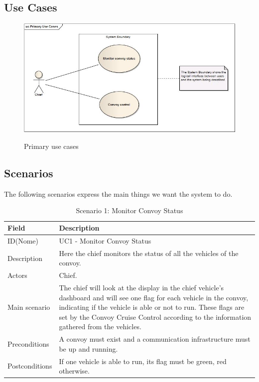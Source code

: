 \documentclass{llncs}
\newcommand{\labelfig}[1]{\label{fig:#1}}
\begin{document}
\newpage

\subsection{Use Cases}

\begin{figure}
   \centering
   \includegraphics[scale = 0.5]{../Diagrams/Primary_Use_Cases.jpg}\\
  \caption{Primary use cases}\labelfig{testTypes}
\end{figure}

\subsection{Scenarios}
The following scenarios express the main things we want the system to do. 

\begin{table}[H]
\caption{Scenario 1: Monitor Convoy Status}
\label{tab:Scenario1}
\begin{tabular}{| p{2cm} | p{10cm} |}
\hline
\bf{Field} & \bf{Description}\\[3pt]
\hline
ID(Nome) & UC1 - Monitor Convoy Status\\[3pt]
\hline
Description & Here the chief monitors the status of all the vehicles of the convoy.\\[1pt]
\hline
Actors & Chief.\\[3pt]
\hline
Main scenario & The chief will look at the display in the chief vehicle's dashboard and will see one flag for each vehicle in the convoy, indicating if the vehicle is able or not to run. These flags are set by the Convoy Cruise Control according to the information gathered from the vehicles.\\[3pt]
\hline
Preconditions & A convoy must exist and a communication infrastructure must be up and running.\\[3pt]
\hline
Postconditions & If one vehicle is able to run, its flag must be green, red otherwise.\\[3pt]
\hline
\end{tabular}
\end{table}
\end{document}
